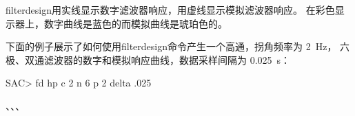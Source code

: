filterdesign用实线显示数字滤波器响应，用虚线显示模拟滤波器响应。
在彩色显示器上，数字曲线是蓝色的而模拟曲线是琥珀色的。

下面的例子展示了如何使用filterdesign命令产生一个高通，拐角频率为 \SI{2}{\Hz}，
六极、双通滤波器的数字和模拟响应曲线，数据采样间隔为 \SI{0.025}{\s}：
\begin{SACCode}
SAC> fd hp c 2 n 6 p 2 delta .025
\end{SACCode}

、、、
